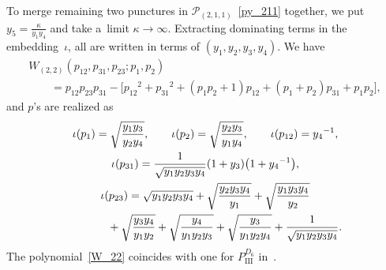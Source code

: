 \documentclass[10pt,a4paper]{amsart}
\numberwithin{equation}{section}
\begin{document}
To merge remaining two punctures in $\mathcal{P}_{(2,1,1)}$~\eqref{py_211} together, we put $ y_5 = \frac{\kappa}{y_1 y_4}$ and take a~limit $\kappa\to \infty$. Extracting dominating terms in the embedding~$\iota$, all are written in terms of $(y_1, y_2, y_3, y_4)$. We have
\begin{gather}
 W_{(2,2)}(p_{12}, p_{31}, p_{23}; p_1, p_2)\nonumber \\
 \qquad {}= p_{12} p_{23} p_{31} - \big[ {p_{12}}^2 + {p_{31}}^2 + ( p_1 p_2+ 1 ) p_{12} + ( p_1 + p_2 ) p_{31} + p_1 p_2 \big], \label{W_22}
\end{gather}
 and $p$'s are realized as
\begin{gather}
 \iota(p_1) = \sqrt{\frac{y_1 y_3}{y_2 y_4}} ,\qquad \iota(p_2) = \sqrt{\frac{y_2 y_3}{y_1 y_4}},
\qquad \iota(p_{12}) = {y_4}^{-1} ,\nonumber \\
 \iota(p_{31}) = \frac{1}{\sqrt{y_1 y_2 y_3 y_4}} ( 1 + y_3 ) \big( 1 + {y_4}^{-1} \big) ,\nonumber \\
 \iota(p_{23}) = \sqrt{y_1 y_2 y_3 y_4} +\sqrt{\frac{y_2 y_3 y_4}{y_1}} +\sqrt{\frac{y_1 y_3 y_4}{y_2}}\nonumber \\
\hphantom{\iota(p_{23}) =}{} + \sqrt{\frac{y_3 y_4}{y_1 y_2}} +\sqrt{\frac{y_4}{y_1 y_2 y_3}} + \sqrt{\frac{y_3}{y_1 y_2 y_4}} + \frac{1}{\sqrt{y_1 y_2 y_3 y_4}} . \label{py_22}
\end{gather}
The polynomial~\eqref{W_22} coincides with one for $P_{\mathrm{III}}^{D_6}$ in~\cite{vdPutSaito09a}.
\end{document}
